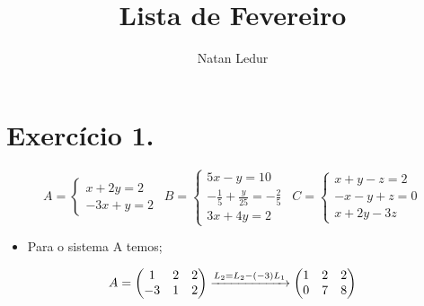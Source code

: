 \documentclass{article}
\title{Lista de Fevereiro}
\author{Natan Ledur}
\begin{document}
\maketitle

\section{Exercício 1.}
\begin{equation*}
      A= \left\{\begin{matrix} x + 2y = 2 \\  -3x + y=2 \end{matrix}\right. 
       \ \
      B = \left\{\begin{matrix} 5x - y = 10 \\ -\frac{1}{5} + \frac{y}{25} = -\frac{2}{5} \\ 3x+4y=2 \end{matrix}\right.
      \ \
      C = \left\{\begin{matrix}  x + y - z = 2 \\ -x -y +z = 0 \\ x+2y-3z \end{matrix}\right.
      \end{equation*}
      \begin{itemize}
          \item Para o sistema A temos;
      \end{itemize}
      \begin{equation*}
      A=\begin{pmatrix}  1&2  &2 \\   -3&  1& 2\end{pmatrix}
      \xrightarrow[]{L_2=L_2 - (-3)L_1}
      \begin{pmatrix} 1 &2  &2 \\  0& 7 & 8 \end{pmatrix}\displaystyle \displaystyle 
      \end{equation*}
       
\end{document}
